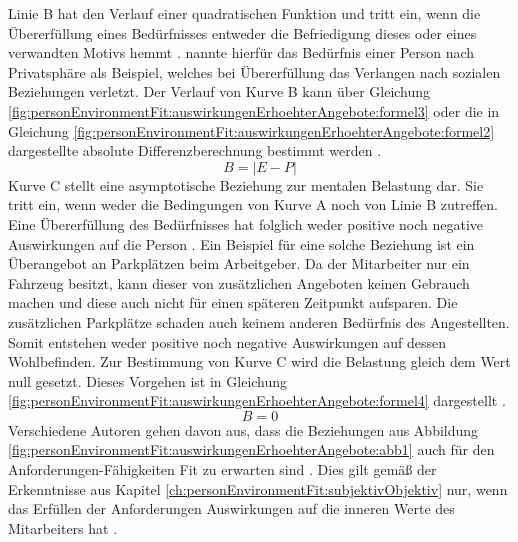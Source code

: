 Linie B hat den Verlauf einer quadratischen Funktion und tritt ein, wenn die Übererfüllung eines Bedürfnisses entweder die Befriedigung dieses oder eines verwandten Motivs hemmt \cite[S. 5]{caplan:1987}\cite[S. 21]{edwards:2008}. \textcite[S. 12]{harrison:1978} nannte hierfür das Bedürfnis einer Person nach Privatsphäre als Beispiel, welches bei Übererfüllung das Verlangen nach sozialen Beziehungen verletzt. Der Verlauf von Kurve B kann über Gleichung \ref{fig:personEnvironmentFit:auswirkungenErhoehterAngebote:formel3} oder die in Gleichung \ref{fig:personEnvironmentFit:auswirkungenErhoehterAngebote:formel2} dargestellte absolute Differenzberechnung bestimmt werden \cite[S. 2]{edwards:1993}.
\begin{equation}
	B = |E - P|
	\label{fig:personEnvironmentFit:auswirkungenErhoehterAngebote:formel2}
\end{equation}
Kurve C stellt eine asymptotische Beziehung zur mentalen Belastung dar. Sie tritt ein, wenn weder die Bedingungen von Kurve A noch von Linie B zutreffen. Eine Übererfüllung des Bedürfnisses hat folglich weder positive noch negative Auswirkungen auf die Person \cite[S. 30]{mechanismsOfJobStressAndStrain:1982}. Ein Beispiel für eine solche Beziehung ist ein Überangebot an Parkplätzen beim Arbeitgeber. Da der Mitarbeiter nur ein Fahrzeug besitzt, kann dieser von zusätzlichen Angeboten keinen Gebrauch machen und diese auch nicht für einen späteren Zeitpunkt aufsparen. Die zusätzlichen Parkplätze schaden auch keinem anderen Bedürfnis des Angestellten. Somit entstehen weder positive noch negative Auswirkungen auf dessen Wohlbefinden. Zur Bestimmung von Kurve C wird die Belastung gleich dem Wert null gesetzt. Dieses Vorgehen ist in Gleichung \ref{fig:personEnvironmentFit:auswirkungenErhoehterAngebote:formel4} dargestellt \cite[S. 2]{edwards:1993}.
\begin{equation}
	B = 0
	\label{fig:personEnvironmentFit:auswirkungenErhoehterAngebote:formel4}
\end{equation}
Verschiedene Autoren gehen davon aus, dass die Beziehungen aus Abbildung \ref{fig:personEnvironmentFit:auswirkungenErhoehterAngebote:abb1} auch für den Anforderungen-Fähigkeiten Fit zu erwarten sind \cite[S. 31]{mechanismsOfJobStressAndStrain:1982}\cite[S. 12f.]{harrison:1978}. Dies gilt gemäß der Erkenntnisse aus Kapitel \ref{ch:personEnvironmentFit:subjektivObjektiv} nur, wenn das Erfüllen der Anforderungen Auswirkungen auf die inneren Werte des Mitarbeiters hat \cite[S. 12f.]{harrison:1978}.

